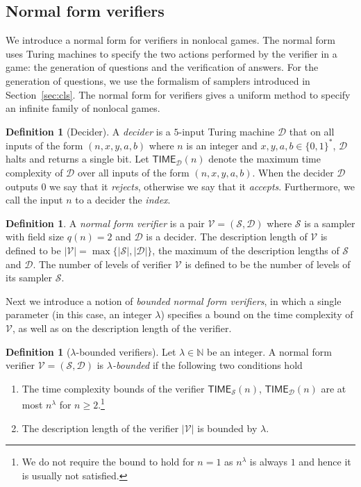 \documentclass[11pt]{article}
\theoremstyle{definition}
\newtheorem{definition}[theorem]{Definition}
\newcommand{\N}{\ensuremath{\mathbb{N}}}
\newcommand{\abs}[1]{\left\vert {#1} \right\vert}
\newcommand{\sampler}{\mathcal{S}}
\newcommand{\decider}{\mathcal{D}}
\newcommand{\verifier}{\mathcal{V}}
\newcommand{\TIME}{\mathsf{TIME}}
\begin{document}
\subsection{Normal form verifiers}
\label{sec:normal-form}

We introduce a normal form for verifiers in nonlocal games.
The normal form uses Turing machines to specify the two actions performed by the
verifier in a game: the generation of questions and the verification of answers.
For the generation of questions, we use the formalism of samplers introduced in
Section~\ref{sec:cls}.
The normal form for verifiers gives a uniform method to specify an infinite
family of nonlocal games.

\begin{definition}[Decider]
  \label{def:decider}
  A \emph{decider} is a $5$-input Turing machine $\decider$ that on all inputs
  of the form $(n,x,y,a,b)$ where $n$ is an integer and $x,y,a,b \in \{0,1\}^*$,
  $\decider$ halts and returns a single bit.
  Let $\TIME_\decider(n)$ denote the maximum time complexity of $\decider$ over
  all inputs of the form $(n,x,y,a,b)$.
	When the decider $\decider$ outputs $0$ we say that it \emph{rejects},
  otherwise we say that it \emph{accepts}.
  Furthermore, we call the input $n$ to a decider the \emph{index}.
\end{definition}

\begin{definition}
  \label{def:normal-ver}
  A \emph{normal form verifier} is a pair $\verifier = (\sampler, \decider)$
  where $\sampler$ is a sampler with field size $q(n) = 2$ and $\decider$ is a
  decider.
  The description length of $\verifier$ is defined to be $\abs{\verifier} =
  \max \{ \abs{\sampler} ,  \abs{\decider} \}$, the maximum of the description lengths of
  $\sampler$ and $\decider$.
  The number of levels of verifier $\verifier$ is defined to be the number of
  levels of its sampler $\sampler$.
\end{definition}

Next we introduce a notion of \emph{bounded normal form
  verifiers}, in which a single parameter (in this case, an integer $\lambda$)
specifies a bound on the time complexity of $\verifier$, as well as on the
description length of the verifier.

\begin{definition}[$\lambda$-bounded verifiers]
  \label{def:lambda}
  Let $\lambda \in \N$ be an integer.
  A normal form verifier $\verifier = (\sampler, \decider)$ is
  \emph{$\lambda$-bounded} if the following two conditions hold
  \begin{enumerate}
  \item The time complexity bounds of the verifier $\TIME_\sampler(n)$,
    $\TIME_\decider(n)$ are at most $n^\lambda$ for $n \ge 2$.\footnote{We do
      not require the bound to hold for $n=1$ as $n^\lambda$ is always $1$ and
      hence it is usually not satisfied.
    }
  \item The description length of the verifier $\abs{\verifier}$ is bounded by $\lambda$.
  \end{enumerate}
\end{definition}
\end{document}
